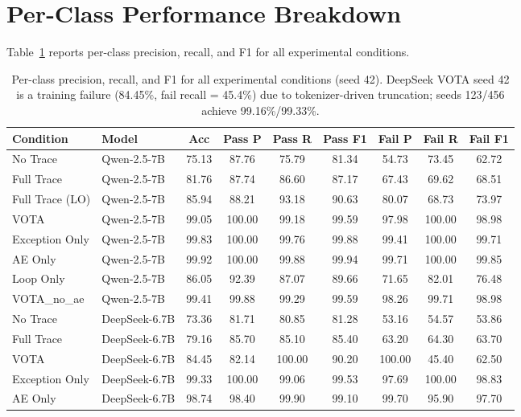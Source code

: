 \section{Per-Class Performance Breakdown}
\label{sec:per_class}

Table~\ref{tab:per_class} reports per-class precision, recall, and F1 for all experimental conditions.

\begin{table}[t]
\centering
\caption{Per-class precision, recall, and F1 for all experimental conditions (seed 42). DeepSeek VOTA seed 42 is a training failure (84.45\%, fail recall = 45.4\%) due to tokenizer-driven truncation; seeds 123/456 achieve 99.16\%/99.33\%.}
\label{tab:per_class}
\small
\begin{tabular}{llccccccc}
\toprule
\textbf{Condition} & \textbf{Model} & \textbf{Acc} & \textbf{Pass P} & \textbf{Pass R} & \textbf{Pass F1} & \textbf{Fail P} & \textbf{Fail R} & \textbf{Fail F1} \\
\midrule
No Trace          & Qwen-2.5-7B & 75.13 & 87.76 & 75.79 & 81.34 & 54.73 & 73.45 & 62.72 \\
Full Trace        & Qwen-2.5-7B & 81.76 & 87.74 & 86.60 & 87.17 & 67.43 & 69.62 & 68.51 \\
Full Trace (LO)   & Qwen-2.5-7B & 85.94 & 88.21 & 93.18 & 90.63 & 80.07 & 68.73 & 73.97 \\
VOTA              & Qwen-2.5-7B & 99.05 & 100.00 & 99.18 & 99.59 & 97.98 & 100.00 & 98.98 \\
Exception Only    & Qwen-2.5-7B & 99.83 & 100.00 & 99.76 & 99.88 & 99.41 & 100.00 & 99.71 \\
AE Only           & Qwen-2.5-7B & 99.92 & 100.00 & 99.88 & 99.94 & 99.71 & 100.00 & 99.85 \\
Loop Only         & Qwen-2.5-7B & 86.05 & 92.39 & 87.07 & 89.66 & 71.65 & 82.01 & 76.48 \\
VOTA\_no\_ae       & Qwen-2.5-7B & 99.41 & 99.88 & 99.29 & 99.59 & 98.26 & 99.71 & 98.98 \\
\midrule
No Trace          & DeepSeek-6.7B & 73.36 & 81.71 & 80.85 & 81.28 & 53.16 & 54.57 & 53.86 \\
Full Trace        & DeepSeek-6.7B & 79.16 & 85.70 & 85.10 & 85.40 & 63.20 & 64.30 & 63.70 \\
VOTA              & DeepSeek-6.7B & 84.45 & 82.14 & 100.00 & 90.20 & 100.00 & 45.40 & 62.50 \\
Exception Only    & DeepSeek-6.7B & 99.33 & 100.00 & 99.06 & 99.53 & 97.69 & 100.00 & 98.83 \\
AE Only           & DeepSeek-6.7B & 98.74 & 98.40 & 99.90 & 99.10 & 99.70 & 95.90 & 97.70 \\
\bottomrule
\end{tabular}
\end{table}

